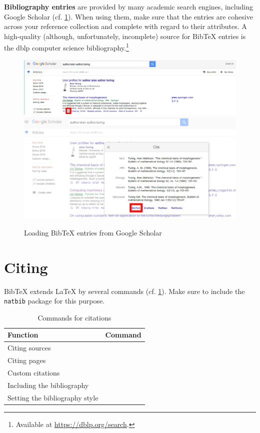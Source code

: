 \textbf{Bibliography entries} are provided by many academic search engines, including Google Scholar (cf. \cref{fig:google-scholar-bibtex}).
When using them, make sure that the entries are cohesive across your reference collection and complete with regard to their attributes.
A high-quality (although, unfortunately, incomplete) source for Bib\TeX{} entries is the dblp computer science bibliography.\footnote{Available at \url{https://dblp.org/search}.}

\begin{figure}[H]
  \includegraphics[width=\textwidth]{graphics/google_bibtex1.jpg}  
  \includegraphics[width=\textwidth]{graphics/google_bibtex2.jpg}  
  \caption{Loading Bib\TeX{} entries from Google Scholar}
  \label{fig:google-scholar-bibtex}
\end{figure}

\section{Citing}
Bib\TeX{} extends \LaTeX{} by several commands (cf. \cref{tbl:bibtex-commands}). 
Make sure to include the \texttt{natbib} package for this purpose.

\begin{table}[H]
  \centering
  \begin{tabular}{ll}
  \toprule
  Function                 & Command \\ \midrule
  Citing sources           & \texttt{\cite{<source>}} \\
  Citing pages             & \texttt{\cite[p. 15]{<source>}} \\
  Custom citations         & \texttt{\cite[<prefix>][<suffix>]{<source>}} \\
  Including the bibliography     & \texttt{} \\
  Setting the bibliography style & \texttt{} \\ \bottomrule
  \end{tabular}
  \caption{Commands for citations}
  \label{tbl:bibtex-commands}
\end{table}

